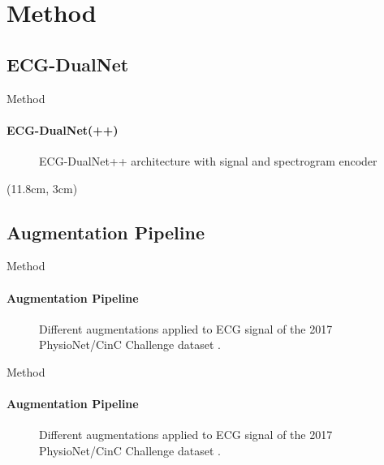 \section{Method}

\subsection{ECG-DualNet}
\begin{frame}{Method}
\framesubtitle{ECG-DualNet(++)}
    \begin{figure}[!ht]
        \centering
        
        \caption{ECG-DualNet++ architecture with signal and spectrogram encoder}
        \label{fig:ecg_dual_net}
    \end{figure}
    \begin{textblock*}{3cm}(11.8cm, 3cm)
        \raggedright
        \cite{Vaswani2017}
        \cite{Wang2020}
        \cite{Dosovitskiy2020}
        \cite{De2017}
    \end{textblock*}
\end{frame}

\subsection{Augmentation Pipeline}
\begin{frame}{Method}
\framesubtitle{Augmentation Pipeline}
    \vspace{-0.251cm}
    \begin{figure}[!ht]
        \setlength{\figH}{4.5cm}
        \setlength{\figW}{0.33\textwidth}
        \centering
        
        \caption{Different augmentations applied to ECG signal of the 2017 PhysioNet/CinC Challenge dataset \cite{Clifford2017}.}
        \label{fig:ecg_aug_1}
    \end{figure}
\end{frame}

\begin{frame}{Method}
\framesubtitle{Augmentation Pipeline}
    \vspace{-0.24cm}
    \begin{figure}[!ht]
        \setlength{\figH}{4.5cm}
        \setlength{\figW}{0.33\textwidth}
        \centering
        
        \caption{Different augmentations applied to ECG signal of the 2017 PhysioNet/CinC Challenge dataset \cite{Clifford2017}.}
        \label{fig:ecg_aug_2}
    \end{figure}
\end{frame}

